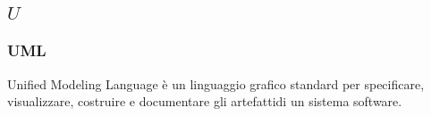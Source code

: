 \subsection*{\quad$U\quad$}
\subsubsection*{UML}
Unified Modeling Language è un linguaggio grafico standard per specificare, visualizzare, costruire e documentare gli artefatti\glosp di un sistema software.

